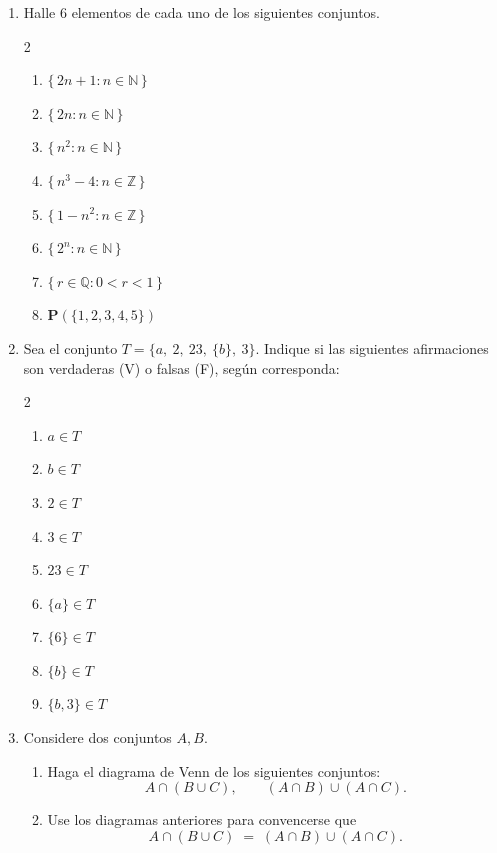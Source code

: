 \documentclass[12pt]{article}
\begin{document}
\begin{enumerate}
\item Halle $6$ elementos de cada uno de los siguientes conjuntos.
\begin{multicols}{2}
   \begin{enumerate}
    \item $\{\,2n + 1 : n \in \mathbb{N}\,\}$
    \item $\{\,2n : n \in \mathbb{N}\,\}$
    \item $\{\,n^{2} : n \in \mathbb{N}\,\}$
    \item $\{\,n^{3} - 4 : n \in \mathbb{Z}\,\}$
    \item $\{\,1 - n^{2} : n \in \mathbb{Z}\,\}$
    \item $\{\,2^{n} : n \in \mathbb{N}\,\}$
    \item $\{\,r \in \mathbb{Q} : 0 < r < 1\,\}$
    \item $\mathbf{P}(\{1,2,3,4,5\})$
\end{enumerate} 
\end{multicols}


\item Sea el conjunto $T = \{a,\ 2,\ 23,\ \{b\},\ 3\}$. Indique si las siguientes afirmaciones son verdaderas (V) o falsas (F), según corresponda:
\begin{multicols}{2}
\begin{enumerate}
    \item $a \in T$
    \item $b \in T$
    \item $2 \in T$
    \item $3 \in T$
    \item $23 \in T$
    \item  $\{a\} \in T$
    \item $\{6\} \in T$
    \item $\{b\} \in T$
    \item $\{b,3\} \in T$
\end{enumerate}
\end{multicols}

\item Considere dos conjuntos $A, B$. 
\begin{enumerate}
    \item[a)] Haga el diagrama de Venn de los siguientes conjuntos:
    \[
    A \cap (B \cup C), \qquad (A \cap B) \cup (A \cap C).
    \]

    \item[b)] Use los diagramas anteriores para convencerse que
    \[
    A \cap (B \cup C) \;=\; (A \cap B) \cup (A \cap C).
    \]
\end{enumerate}


\end{enumerate}
\end{document}
